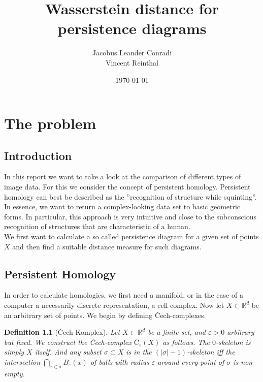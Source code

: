 \documentclass[11pt, a4paper,draft]{report}
\author{Jacobus Leander Conradi\\Vincent Reinthal}
\date{\today}
\title{Wasserstein distance for persistence diagrams}
\newtheorem{definition}{Definition}
\newcommand{\bR}{\mathbb{R}}
\begin{document}
 
	\maketitle
	
	\thispagestyle{plain}
	\addtocounter{page}{-1}
	\tableofcontents 
	\vfil\null
	\clearpage
	\thispagestyle{empty}\mbox{}
	\clearpage
	
	\chapter{The problem}
	\section{Introduction}
	In this report we want to take a look at the comparison of different types of image data. For this we consider the concept of persistent homology. Persistent homology can best be described as the ''recognition of structure while squinting''. In essence, we want to return a complex-looking data set to basic geometric forms. In particular, this approach is very intuitive and close to the subconscious recognition of structures that are characteristic of a human.\\
	We first want to calculate a so called persistence diagram for a given set of points $X$ and then find a suitable distance measure for such diagrams.
	
	
	\section{Persistent Homology}
	
	In order to calculate homologies, we first need a manifold, or in the case of a computer a necessarily discrete representation, a cell complex. Now let $X\subset \bR^d$ be an arbitrary set of points. We begin by defining Čech-complexes.
	
	\begin{definition}[Čech-Komplex]
		Let $X\subset \bR^d$ be a finite set, and $\varepsilon>0$ arbitrary but fixed. We construct the Čech-complex $Č_\varepsilon(X)$ as follows. The $0$-skeleton is simply $X$ itself. And any subset $\sigma\subset X$ is in the $(|\sigma|-1)$-skeleton iff the intersection $\bigcap_{x\in\sigma}B_\varepsilon(x)$ of balls with radius $\varepsilon$ around every point of $\sigma$ is non-empty.
	\end{definition}
\end{document}
